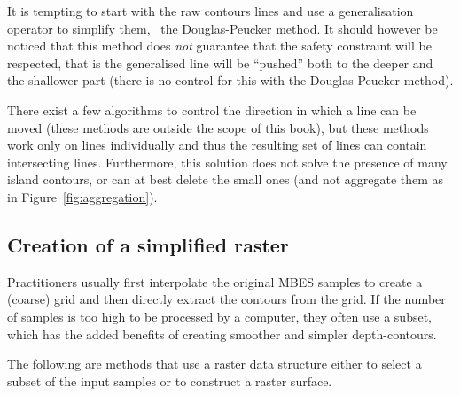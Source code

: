 It is tempting to start with the raw contours lines and use a generalisation operator to simplify them, \eg\ the Douglas-Peucker method.
It should however be noticed that this method does \emph{not} guarantee that the safety constraint will be respected, that is the generalised line will be ``pushed'' both to the deeper and the shallower part (there is no control for this with the Douglas-Peucker method).

There exist a few algorithms to control the direction in which a line can be moved (these methods are outside the scope of this book), but these methods work only on lines individually and thus the resulting set of lines can contain intersecting lines.
Furthermore, this solution does not solve the presence of many island contours, or can at best delete the small ones (and not aggregate them as in Figure~\ref{fig:aggregation}).

\subsection{Creation of a simplified raster}

Practitioners usually first interpolate the original MBES samples to create a (coarse) grid and then directly extract the contours from the grid.
If the number of samples is too high to be processed by a computer, they often use a subset, which has the added benefits of creating smoother and simpler depth-contours.

%

The following are methods that use a raster data structure either to select a subset of the input samples or to construct a raster surface.


%
